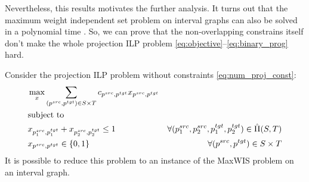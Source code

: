 Nevertheless, this results motivates the further analysis. It turns out that the maximum weight
independent set problem on interval graphs can also be solved in a polynomial time \cite{PalB96}.
So, we can prove that the non-overlapping constrains itself don't make the whole projection
ILP problem \eqref{eq:objective}--\eqref{eq:binary_prog} hard.

Consider the projection ILP problem without constraints \eqref{eq:num_proj_const}:
\begin{equation} \label{eq:ilp_without_nproj}
  \begin{aligned}
    & \max\limits_x \sum\limits_{(p^{src}, p^{tgt}) \in S \times T} c_{p^{src}, p^{tgt}} x_{p^{src}, p^{tgt}}                                             \\
    & \text{subject to}                                                                                                                                   \\
    & x_{p_1^{src}, p_1^{tgt}} + x_{p_2^{src}, p_2^{tgt}} \leq 1
    & \forall (p_1^{src}, p_2^{src}, p_1^{tgt}, p_2^{tgt}) \in \hat{\Pi}(S, T)                                                                            \\
    & x_{p^{src}, p^{tgt}} \in \{ 0, 1 \}                                                                     & \forall (p^{src}, p^{tgt}) \in S \times T
  \end{aligned}
\end{equation}
It is possible to reduce this problem to an instance of the MaxWIS problem on an
interval graph.

